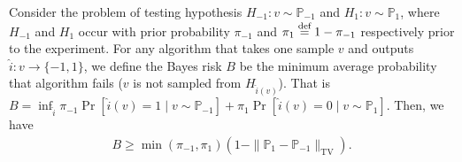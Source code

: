 \begin{comment}
\begin{definition}[Bayes Risk, \cite{LR05}]
Suppose parameter $\theta$ is assumed
known only that it lies in a certain set $\Theta$ and consider a set of probability distributions $P=\{P_\theta:\theta\in\Theta\}$.
Given $\theta$, we can get observations $Y$ and can output an estimator $\hat{\theta}(Y)$ %
by a testing function $\hat{\theta}$.
We use a loss function $l(\theta,\hat{\theta})$ to quantifies the quality of the estimator.
For a prior distribution $\pi$ on $\Theta$, the average risk is defined as
\begin{align*}
    B_{\pi}(\hat{\theta})=\E_{\theta\sim\pi,Y\sim P_\theta}l(\theta,\hat{\theta}).
\end{align*}
The Bayes risk is the minimum that the average risk can achieve, i.e.
\begin{align*}
    B_{\pi}^*=\inf_{\hat{\theta}}B_{\pi}(\hat{\theta}).
\end{align*}
\end{definition}

\begin{lemma}[{\cite[Lemma 1]{ACCD12}}]
\label{lm:Bayes_risk}
Consider the problem of testing hypothesis $H_{-1}:v \sim \mathbb{P}_{-1}$ and $H_1:v\sim \mathbb{P}_1$, where $H_{-1}$ and $H_1$ are occurred with prior probability $\pi_{-1}$ and $\pi_1$ respectively prior to the experiment. Under the 0-1 loss, the Bayes risk $B$ satisfies
\begin{align*}
    B\geq \min(\pi_{-1},\pi_1)(1-\|\mathbb{P}_1-\mathbb{P}_{-1}\|_{\mathrm{TV}}).
\end{align*}
\end{lemma}
\end{comment}

\begin{lemma}
\label{lm:Bayes_risk}
Consider the problem of testing hypothesis $H_{-1}:v \sim \mathbb{P}_{-1}$ and $H_1:v\sim \mathbb{P}_1$, where $H_{-1}$ and $H_1$ occur with prior probability $\pi_{-1}$ and $\pi_1\stackrel{{\text{def}}}{=}1-\pi_{-1}$ respectively prior to the experiment. 
For any algorithm that takes one sample $v$ and outputs $\hat{i}:v\rightarrow\{-1,1\}$, we define the Bayes risk $B$ be the minimum average probability that algorithm fails ($v$ is not sampled from $H_{\hat{i}(v)}$).
That is $B=\inf_{\hat{i}}\pi_{-1}\Pr[\hat{i}(v)=1\mid v\sim \mathbb{P}_{-1}]+\pi_1\Pr[\hat{i}(v)=0\mid v\sim \mathbb{P}_1]$.
Then, we have
\begin{align*}
    B\geq \min(\pi_{-1},\pi_1)(1-\|\mathbb{P}_1-\mathbb{P}_{-1}\|_{\mathrm{TV}}).
\end{align*}
\end{lemma}

